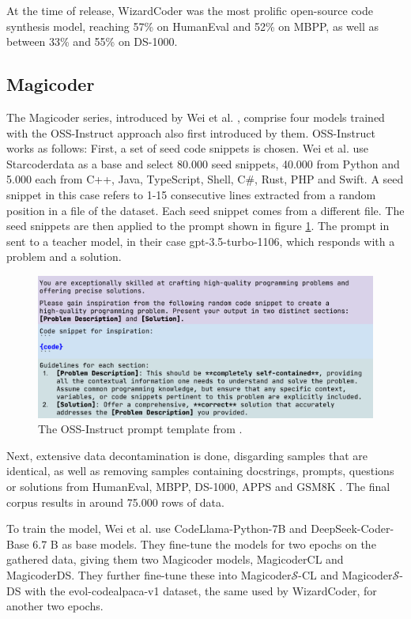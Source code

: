 At the time of release, WizardCoder was the most prolific open-source code synthesis model, reaching 57\% on HumanEval and 52\% on MBPP, as well as between 33\% and 55\% on DS-1000.


\subsection{Magicoder}
\label{sec:magicoder}
The Magicoder series, introduced by Wei et al. \cite{Wei.2024}, comprise four models trained with the OSS-Instruct approach also first introduced by them.
OSS-Instruct works as follows:
First, a set of seed code snippets is chosen. Wei et al. use Starcoderdata as a base and select 80.000 seed snippets, 40.000 from Python and 5.000 each from C++, Java, TypeScript, Shell, C\#, Rust, PHP and Swift.
A seed snippet in this case refers to 1-15 consecutive lines extracted from a random position in a file of the dataset.
Each seed snippet comes from a different file.
The seed snippets are then applied to the prompt shown in figure \ref{fig:magicoder}.
The prompt in sent to a teacher model, in their case gpt-3.5-turbo-1106, which responds with a problem and a solution.

\begin{figure}[!h]
    \centering
    \includegraphics[width=\textwidth]{bilder/kapitel3/magicoder.png}
    \caption{The OSS-Instruct prompt template from \cite{Wei.2024}.}
    \label{fig:magicoder}
\end{figure}

Next, extensive data decontamination is done, disgarding samples that are identical, as well as removing samples containing docstrings, prompts, questions or solutions from HumanEval, MBPP, DS-1000, APPS and GSM8K \cite{Cobbe.2021}.
The final corpus results in around 75.000 rows of data.

To train the model, Wei et al. use CodeLlama-Python-7B and DeepSeek-Coder-Base 6.7 B as base models.
They fine-tune the models for two epochs on the gathered data, giving them two Magicoder models, MagicoderCL and MagicoderDS.
They further fine-tune these into Magicoder$\mathcal{S}$-CL and Magicoder$\mathcal{S}$-DS with the evol-codealpaca-v1 dataset, the same used by WizardCoder, for another two epochs.

